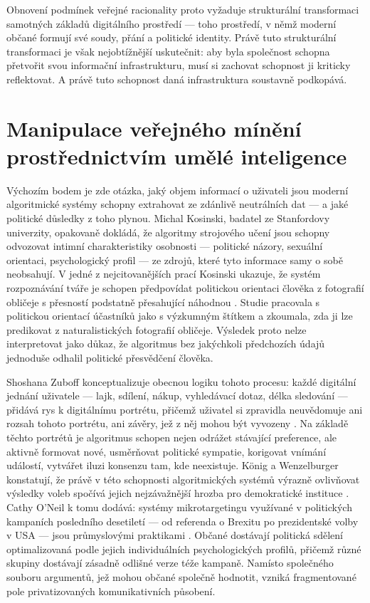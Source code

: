 Obnovení podmínek veřejné racionality proto vyžaduje strukturální transformaci samotných základů digitálního prostředí — toho prostředí, v němž moderní občané formují své soudy, přání a politické identity.
Právě tuto strukturální transformaci je však nejobtížnější uskutečnit: aby byla společnost schopna přetvořit svou informační infrastrukturu, musí si zachovat schopnost ji kriticky reflektovat. A právě tuto schopnost daná infrastruktura soustavně podkopává.

\section{Manipulace veřejného mínění prostřednictvím umělé inteligence}

Výchozím bodem je zde otázka, jaký objem informací o uživateli jsou moderní algoritmické systémy schopny extrahovat ze zdánlivě neutrálních dat — a jaké politické důsledky z toho plynou.
Michal Kosinski, badatel ze Stanfordovy univerzity, opakovaně dokládá, že algoritmy strojového učení jsou schopny odvozovat intimní charakteristiky osobnosti — politické názory, sexuální orientaci, psychologický profil — ze zdrojů, které tyto informace samy o sobě neobsahují.
V jedné z nejcitovanějších prací Kosinski ukazuje, že systém rozpoznávání tváře je schopen předpovídat politickou orientaci člověka z  fotografií obličeje s přesností podstatně přesahující náhodnou \parencite{Kosinski21}.
Studie pracovala s politickou orientací účastníků jako s výzkumným štítkem a zkoumala, zda ji lze predikovat z naturalistických fotografií obličeje. Výsledek proto nelze interpretovat jako důkaz, že algoritmus bez jakýchkoli předchozích údajů jednoduše odhalil politické přesvědčení člověka.

Shoshana Zuboff konceptualizuje obecnou logiku tohoto procesu: každé digitální jednání uživatele — lajk, sdílení, nákup, vyhledávací dotaz, délka sledování — přidává rys k digitálnímu portrétu, přičemž uživatel si zpravidla neuvědomuje ani rozsah tohoto portrétu, ani závěry, jež z něj mohou být vyvozeny \parencite{Zuboff19}.
Na základě těchto portrétů je algoritmus schopen nejen odrážet stávající preference, ale aktivně formovat nové, usměrňovat politické sympatie, korigovat vnímání událostí, vytvářet iluzi konsenzu tam, kde neexistuje. König a Wenzelburger konstatují, že právě v této schopnosti algoritmických systémů výrazně ovlivňovat výsledky voleb spočívá jejich nejzávažnější hrozba pro demokratické instituce \parencite{KoenigWenzelburger20}.
Cathy O'Neil k tomu dodává: systémy mikrotargetingu využívané v politických kampaních posledního desetiletí — od referenda o Brexitu po prezidentské volby v USA — jsou průmyslovými praktikami \parencite{ONeil16}.
Občané dostávají politická sdělení optimalizovaná podle jejich individuálních psychologických profilů, přičemž různé skupiny dostávají zásadně odlišné verze téže kampaně.
Namísto společného souboru argumentů, jež mohou občané společně hodnotit, vzniká fragmentované pole privatizovaných komunikativních působení.

